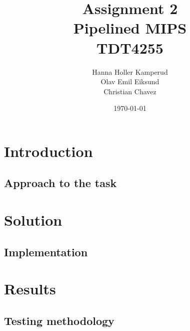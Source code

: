 \documentclass{report}
\title{Assignment 2 \\ Pipelined MIPS \\ TDT4255} %
\author{Hanna Holler Kamperud \\ Olav Emil Eiksund \\ Christian Chavez} %
\date{\today} %
\begin{document}
\maketitle %

\newpage
\begin{abstract}

\end{abstract}

\tableofcontents


\chapter{Introduction}


\section{Approach to the task}


\chapter{Solution}




\section{Implementation}


\newpage
\chapter{Results}


\section{Testing methodology}

\end{document}
